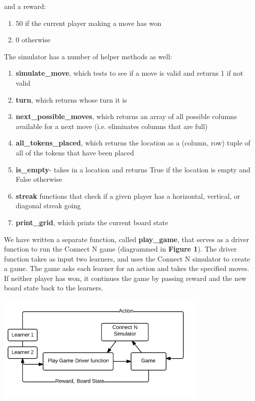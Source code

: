 \documentclass[12pt]{article}
\begin{document}
and a reward:
\begin{enumerate}
\item 50 if the current player making a move has won
\item 0 otherwise
\end{enumerate}

The simulator has a number of helper methods as well:
\begin{enumerate}
\item \textbf{simulate\_move}, which tests to see if a move is valid and returns 1 if not valid
\item \textbf{turn}, which returns whose turn it is 
\item \textbf{next\_possible\_moves}, which returns an array of all possible columns available for a next move (i.e. eliminates columns that are full)
\item \textbf{all\_tokens\_placed}, which returns the location as a (column, row) tuple of all of the tokens that have been placed					
\item \textbf{is\_empty}- takes in a location and returns True if the location is empty and False otherwise
\item \textbf{streak} functions that check if a given player has a horizontal, vertical, or diagonal streak going
\item \textbf{print\_grid}, which prints the current board state
\end{enumerate}

We have written a separate function, called \textbf{play\_game}, that serves as a driver function to run the Connect N game (diagrammed in \textbf{Figure 1}).  The driver function takes as input two learners, and uses the Connect N simulator to create a game. The game asks each learner for an action and takes the specified moves. If neither player has won, it continues the game by passing reward and the new board state back to the learners.

\includegraphics[scale=.7]{game_process.png}
\end{document}
